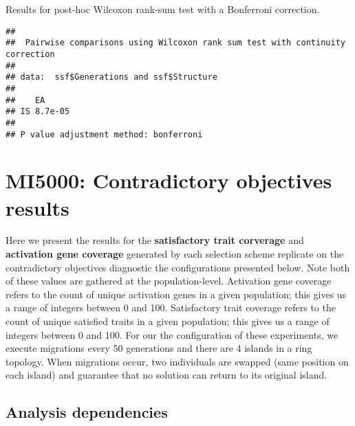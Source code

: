 \documentclass[]{book}
\newenvironment{Shaded}{\begin{snugshade}}{\end{snugshade}}
\newcommand{\DataTypeTok}[1]{\textcolor[rgb]{0.13,0.29,0.53}{#1}}
\newcommand{\KeywordTok}[1]{\textcolor[rgb]{0.13,0.29,0.53}{\textbf{#1}}}
\newcommand{\NormalTok}[1]{#1}
\newcommand{\OperatorTok}[1]{\textcolor[rgb]{0.81,0.36,0.00}{\textbf{#1}}}
\newcommand{\OtherTok}[1]{\textcolor[rgb]{0.56,0.35,0.01}{#1}}
\newcommand{\StringTok}[1]{\textcolor[rgb]{0.31,0.60,0.02}{#1}}
\begin{document}
Results for post-hoc Wilcoxon rank-sum test with a Bonferroni correction.

\begin{Shaded}
\end{Shaded}

\begin{verbatim}
## 
##  Pairwise comparisons using Wilcoxon rank sum test with continuity correction 
## 
## data:  ssf$Generations and ssf$Structure 
## 
##    EA     
## IS 8.7e-05
## 
## P value adjustment method: bonferroni
\end{verbatim}

\hypertarget{mi5000-contradictory-objectives-results}{%
\chapter{MI5000: Contradictory objectives results}\label{mi5000-contradictory-objectives-results}}

Here we present the results for the \textbf{satisfactory trait corverage} and \textbf{activation gene coverage} generated by each selection scheme replicate on the contradictory objectives diagnostic the configurations presented below.
Note both of these values are gathered at the population-level.
Activation gene coverage refers to the count of unique activation genes in a given population; this gives us a range of integers between 0 and 100.
Satisfactory trait coverage refers to the count of unique satisfied traits in a given population; this gives us a range of integers between 0 and 100.
For our the configuration of these experiments, we execute migrations every 50 generations and there are 4 islands in a ring topology.
When migrations occur, two individuals are swapped (same position on each island) and guarantee that no solution can return to its original island.

\hypertarget{analysis-dependencies-10}{%
\section{Analysis dependencies}\label{analysis-dependencies-10}}
\end{document}
